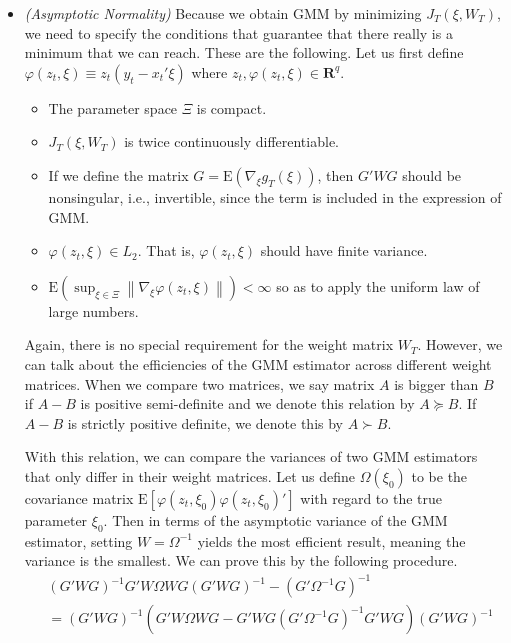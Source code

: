 \documentclass[answers]{exam}
\begin{document}
\begin{questions}
\begin{solution}
\begin{enumerate}[a)]
\begin{itemize}
        \item \emph{(Asymptotic Normality)} Because we obtain GMM by minimizing $J_{T}\left(\xi,W_{T}\right)$, we need to specify the conditions that guarantee that there really is a minimum that we can reach. These are the following. Let us first define $\varphi\left(z_{t},\xi\right)\equiv z_{t}\left(y_{t}-x_{t}'\xi\right)$ where $z_{t},\varphi\left(z_{t},\xi\right)\in \mathbf{R}^{q}$.
        \begin{itemize}
          \item The parameter space $\Xi$ is compact.
          \item $J_{T}\left(\xi,W_{T}\right)$ is twice continuously differentiable.
          \item If we define the matrix $G=\mathrm{E}\left(\nabla_{\xi}g_{T}\left(\xi\right)\right)$, then $G'WG$ should be nonsingular, i.e., invertible, since the term is included in the expression of GMM.
          \item $\varphi\left(z_{t},\xi\right)\in L_{2}$. That is, $\varphi\left(z_{t},\xi\right)$ should have finite variance.
          \item $\mathrm{E}\left(\sup_{\xi\in\Xi}\left\|\nabla_{\xi}\varphi\left(z_{t},\xi\right)\right\|\right)<\infty$ so as to apply the uniform law of large numbers.
        \end{itemize}
        Again, there is no special requirement for the weight matrix $W_{T}$. However, we can talk about the efficiencies of the GMM estimator across different weight matrices. When we compare two matrices, we say matrix $A$ is bigger than $B$ if $A-B$ is positive semi-definite and we denote this relation by $A\succeq B$. If $A-B$ is strictly positive definite, we denote this by $A \succ B$.\par
        With this relation, we can compare the variances of two GMM estimators that only differ in their weight matrices. Let us define $\Omega\left(\xi_{0}\right)$ to be the covariance matrix $\mathrm{E}\left[\varphi\left(z_{t},\xi_{0}\right)\varphi\left(z_{t},\xi_{0}\right)'\right]$ with regard to the true parameter $\xi_{0}$. Then in terms of the asymptotic variance of the GMM estimator, setting $W=\Omega^{-1}$ yields the most efficient result, meaning the variance is the smallest. We can prove this by the following procedure.
        \begin{align}
          &\left(G'WG\right)^{-1}G'W\Omega WG\left(G'WG\right)^{-1}-\left(G'\Omega^{-1}G\right)^{-1} \\
          &= \left(G'WG\right)^{-1}\left(G'W\Omega WG-G'WG\left(G'\Omega^{-1}G\right)^{-1}G'WG\right)\left(G'WG\right)^{-1}\\

\end{align}
\end{itemize}
\end{enumerate}
\end{solution}
\end{questions}
\end{document}
